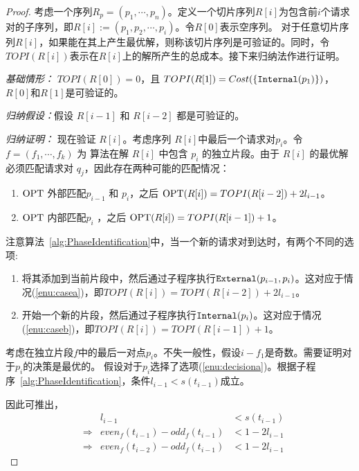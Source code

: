 \begin{proof}
考虑一个序列$R_p = (p_1, \cdots, p_n)$。定义一个切片序列$R[i]$为包含前$i$个请求对的子序列，即$R[i] := (p_1, p_2, \cdots, p_i)$。令$R[0]$表示空序列。
对于任意切片序列$R[i]$，如果\TOPI 能在其上产生最优解，则称该切片序列是可验证的。同时，令$TOPI(R[i])$表示\TOPI 在$R[i]$上的解所产生的总成本。接下来归纳法作进行证明。

\textsl{基础情形：}
$TOPI(R[0]) = 0$，且 $TOPI(R[1]) = Cost(\{\Inter(p_1)\})$，
$R[0]$和$R[1]$是可验证的。

\textsl{归纳假设：}假设 $R[i-1]$ 和 $R[i-2]$ 都是可验证的。

\textsl{归纳证明：}
现在验证 $R[i]$。考虑序列 $R[i]$中最后一个请求对$p_i$。令 $f=(f_1,\cdots,f_k)$ 为 \TOPI 算法在解 $R[i]$ 中包含 $p_i$ 的独立片段。由于 $R[i]$ 的最优解必须匹配请求对 $q_j$，因此存在两种可能的匹配情况：
\renewcommand{\labelenumi}{(\arabic{enumi})}
\begin{enumerate}[align=left, labelsep=0.3em, itemindent=2em, leftmargin=0em]
    \item {
        \label{enu:casea}
        $\mathrm{OPT}$ 外部匹配$p_{i-1}$ 和 $p_i$，之后 $\mathrm{OPT}(R[i])=TOPI(R[i-2]) + 2l_{i-1}$。
    }
    \item {
        \label{enu:caseb}
        $\mathrm{OPT}$ 内部匹配$p_i$ ，之后 $\mathrm{OPT}(R[i])=TOPI(R[i-1]) + 1$。
    }
\end{enumerate}

注意算法~\ref{alg:PhaseIdentification}中，当一个新的请求对到达时，有两个不同的选项:
\renewcommand{\labelenumi}{(\alph{enumi})}
\begin{enumerate}[align=left, labelsep=0.3em, itemindent=2em, leftmargin=0em]
    \item {
        \label{enu:decisiona}
        将其添加到当前片段中，然后通过子程序执行$\Exter(p_{i-1}, p_i)$。这对应于情况(\ref{enu:casea})，即$TOPI(R[i]) = TOPI(R[i-2]) + 2l_{i-1}$。
    }\item{
        \label{enu:decisionb}
        开始一个新的片段，然后通过子程序执行$\Inter(p_{i})$。这对应于情况(\ref{enu:caseb})，即$TOPI(R[i]) = TOPI(R[i-1]) + 1$。
    }
\end{enumerate}

考虑在独立片段$f$中的最后一对点$p_i$。不失一般性，假设$i-f_1$是奇数。需要证明\TOPI 对于$p_i$的决策是最优的。
假设对于$p_i$选择了选项(\ref{enu:decisiona})。根据子程序~\ref{alg:PhaseIdentification}，条件$l_{i-1} < s(t_{i-1})$成立。 

因此可推出，
\begin{align}
     &  &  l_{i-1} & < s(t_{i-1})  \nonumber\\
     & \Rightarrow & even_f(t_{i-1}) - odd_f(t_{i-1}) & < 1 - 2l_{i-1} \nonumber\\
     & \Rightarrow & even_f(t_{i-2}) - odd_f(t_{i-1}) & < 1 - 2l_{i-1} \label{eq:oddeven}
\end{align}


\end{proof}
